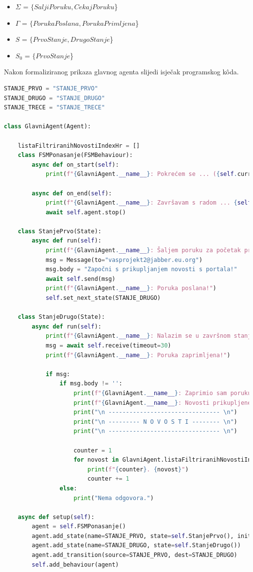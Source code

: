 \documentclass[]{foi} %
\begin{document}
\begin{itemize}
  \item \(\Sigma\) = $\{SaljiPoruku, CekajPoruku$\}
  \item \(\Gamma\) = $\{PorukaPoslana, PorukaPrimljena$\}
  \item \(S\) = $\{PrvoStanje, DrugoStanje$\}
  \item \(S_0\) = $\{PrvoStanje$\}
\end{itemize}

Nakon formaliziranog prikaza glavnog agenta slijedi isječak programskog kôda.
\begin{lstlisting}[language=Python, caption={Programski kôd za GlavniAgent agenta}]
STANJE_PRVO = "STANJE_PRVO"
STANJE_DRUGO = "STANJE_DRUGO"
STANJE_TRECE = "STANJE_TRECE"

class GlavniAgent(Agent):

    listaFiltriranihNovostiIndexHr = []
    class FSMPonasanje(FSMBehaviour):
        async def on_start(self):
            print(f"{GlavniAgent.__name__}: Pokrećem se ... ({self.current_state})")

        async def on_end(self):
            print(f"{GlavniAgent.__name__}: Završavam s radom ... {self.current_state}")
            await self.agent.stop()

    class StanjePrvo(State):
        async def run(self):
            print(f"{GlavniAgent.__name__}: Šaljem poruku za početak prikupljanje novosti s portala ...")
            msg = Message(to="vasprojekt2@jabber.eu.org")
            msg.body = "Započni s prikupljanjem novosti s portala!"
            await self.send(msg)
            print(f"{GlavniAgent.__name__}: Poruka poslana!")
            self.set_next_state(STANJE_DRUGO)

    class StanjeDrugo(State):
        async def run(self):
            print(f"{GlavniAgent.__name__}: Nalazim se u završnom stanju. Čekam na primitak poruke ...")
            msg = await self.receive(timeout=30)
            print(f"{GlavniAgent.__name__}: Poruka zaprimljena!")
                    
            if msg:
                if msg.body != '':
                    print(f"{GlavniAgent.__name__}: Zaprimio sam poruku sljedećeg sadržaja: \"{msg.body}\"")
                    print(f"{GlavniAgent.__name__}: Novosti prikupljene i spremne za prikaz.")
                    print("\n -------------------------------- \n")
                    print("\n --------- N O V O S T I -------- \n")
                    print("\n -------------------------------- \n")

                    counter = 1
                    for novost in GlavniAgent.listaFiltriranihNovostiIndexHr:
                        print(f"{counter}. {novost}")
                        counter += 1
                else:
                    print("Nema odgovora.")

    async def setup(self):
        agent = self.FSMPonasanje()
        agent.add_state(name=STANJE_PRVO, state=self.StanjePrvo(), initial=True)
        agent.add_state(name=STANJE_DRUGO, state=self.StanjeDrugo())
        agent.add_transition(source=STANJE_PRVO, dest=STANJE_DRUGO)
        self.add_behaviour(agent)
\end{lstlisting}
\end{document}
